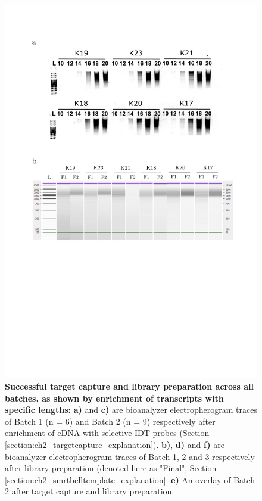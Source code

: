 \begin{figure}[htp]
	\label{fig:isoseq_targeted_pccresults}
\end{figure}


\begin{figure}[!htp]
	\centering
	\vspace{20pt}
	\includegraphics[page=2,trim={0 14cm 3cm 1cm},clip,scale = 0.45]{Figures/TargetedLabResults.pdf}
	\captionsetup{width=0.95\textwidth}
	\caption[Iso-Seq Targeted Transcriptome - Target Capture and library preparation]%
	{\textbf{Successful target capture and library preparation across all batches, as shown by enrichment of transcripts with specific lengths:} \textbf{a)} and \textbf{c)} are bioanalyzer electropherogram traces of Batch 1 (n = 6) and Batch 2 (n = 9) respectively after enrichment of cDNA with selective IDT probes (Section \ref{section:ch2_targetcapture_explanation}). \textbf{b)}, \textbf{d)} and \textbf{f)} are bioanalyzer electropherogram traces of Batch 1, 2 and 3 respectively after library preparation (denoted here as "Final", Section \ref{section:ch2_smrtbelltemplate_explanation}. \textbf{e)} An overlay of Batch 2 after target capture and library preparation. 
}
\end{figure}
